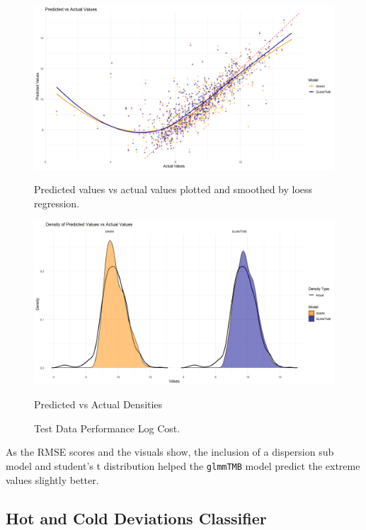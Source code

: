 \documentclass[12pt, twoside,hidelinks]{article}
\theoremstyle{definition}
\numberwithin{equation}{section}
\begin{document}
\begin{figure}[H]
    \centering
        \includegraphics[width=\textwidth]{visuals/Bank_fail_cost/Pred_vs_actuals_loess.png}
        \caption*{Predicted values vs actual values plotted and smoothed by loess regression. }
        \label{fig:hist_pred_errors}

        \includegraphics[width=\textwidth]{visuals/Bank_fail_cost/pred_vs_acutal_density.png}
        \caption*{Predicted vs Actual Densities}
        \label{fig:predicted_vs_actual_densities}

    \caption{Test Data Performance Log Cost.}
    \label{fig:test_data_performance_3}
\end{figure}


As the RMSE scores and the visuals show, the inclusion of a dispersion sub model and student's t distribution helped the \texttt{glmmTMB} model predict the extreme values slightly better.


\subsection{Hot and Cold Deviations Classifier}\label{sec:domains:weatherdata}\label{sec:analysis:sig_temp_anomalies}
\end{document}
